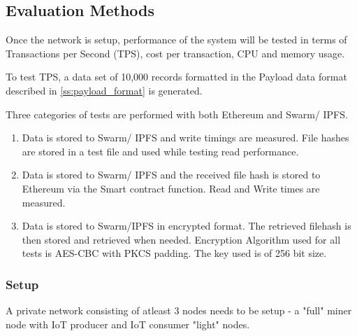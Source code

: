 \documentclass[11pt,openright]{report}
\begin{document}
\subsection{Evaluation Methods}
Once the network is setup, performance of the system will be tested in terms of Transactions per Second (TPS), cost per transaction, CPU and memory usage.

To test TPS, a data set of 10,000 records formatted in the Payload data format described in \ref{ss:payload_format} is generated.

Three categories of tests are performed with both Ethereum and Swarm/ IPFS.
\begin{enumerate}
    \item Data is stored to Swarm/ IPFS and write timings are measured. File hashes are stored in a test file and used while testing read performance.
    \item Data is stored to Swarm/ IPFS and the received file hash is stored to Ethereum via the Smart contract function. Read and Write times are measured.
    \item Data is stored to Swarm/IPFS in encrypted format. The retrieved filehash is then stored and retrieved when needed. Encryption Algorithm used for all tests is AES-CBC with PKCS padding. The key used is of 256 bit size.
\end{enumerate}

\subsubsection{Setup}
A private network consisting of atleast 3 nodes needs to be setup - a "full" miner node with IoT producer and IoT consumer "light" nodes.
\end{document}
